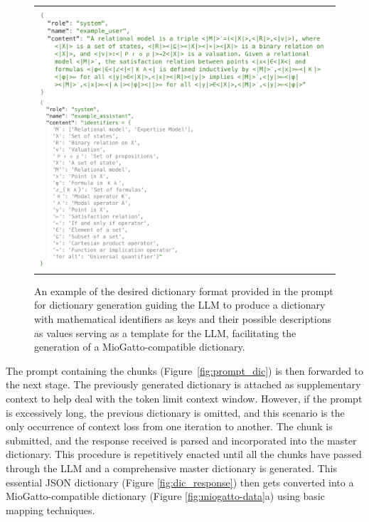 \begin{figure}[htpb]
  \centering
  \begin{tabular}{c}
  \includegraphics[width=14cm]{images/Prompt_dict_example.png}
  \end{tabular}
  \caption{An example of the desired dictionary format provided in the prompt for dictionary generation guiding the LLM to produce a dictionary with mathematical identifiers as keys and their possible descriptions as values serving as a template for the LLM, facilitating the generation of a MioGatto-compatible dictionary.}\label{fig:prompt_dic_example}
\end{figure}

The prompt containing the chunks (Figure~\ref{fig:prompt_dic}) is then forwarded to the next stage. The previously generated dictionary is attached as supplementary context to help deal with the token limit context window.
However, if the prompt is excessively long, the previous dictionary is omitted, and this scenario is the only occurrence of context loss from one iteration to another. The chunk is submitted, and the response received is parsed and incorporated into the master dictionary. This procedure is repetitively enacted until all the chunks have passed through the LLM and a comprehensive master dictionary is generated. This essential JSON dictionary (Figure \ref{fig:dic_response}) then gets converted into a MioGatto-compatible dictionary (Figure \ref{fig:miogatto-data}a) using basic mapping techniques.

